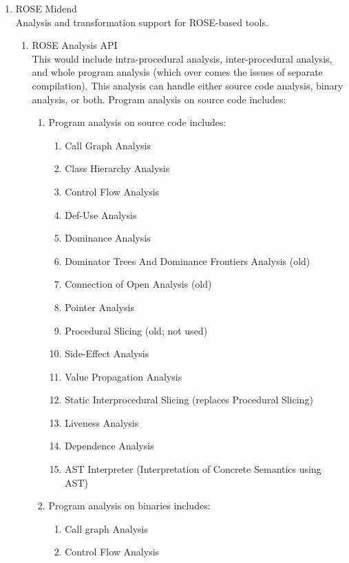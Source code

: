 \begin{enumerate}
   \item ROSE Midend \\
      Analysis and transformation support for ROSE-based tools.
   \begin{enumerate}
      \item ROSE Analysis API \\
         This would include intra-procedural analysis, inter-procedural analysis, 
         and whole program analysis (which over comes the issues of separate compilation).
         This analysis can handle either source code analysis, binary analysis, or both.
         Program analysis on source code includes:
         \begin{enumerate}
            \item Program analysis on source code includes:
            \begin{enumerate}
               \item Call Graph Analysis
               \item Class Hierarchy Analysis
               \item Control Flow Analysis
               \item Def-Use Analysis
               \item Dominance Analysis
               \item Dominator Trees And Dominance Frontiers Analysis (old)
               \item Connection of Open Analysis (old)
               \item Pointer Analysis
               \item Procedural Slicing (old; not used) 
               \item Side-Effect Analysis
               \item Value Propagation Analysis
               \item Static Interprocedural Slicing (replaces Procedural Slicing)
               \item Liveness Analysis
               \item Dependence Analysis
               \item AST Interpreter (Interpretation of Concrete Semantics using AST)
            \end{enumerate}
            \item Program analysis on binaries includes:
            \begin{enumerate}
               \item Call graph Analysis
               \item Control Flow Analysis

\end{enumerate}
\end{enumerate}
\end{enumerate}
\end{enumerate}
